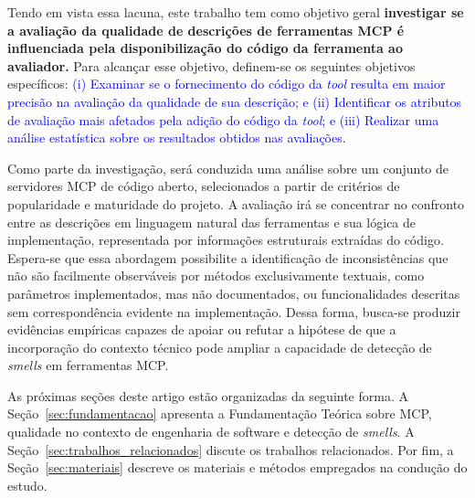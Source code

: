 Tendo em vista essa lacuna, este trabalho tem como objetivo geral \textbf{investigar se a avaliação da qualidade de descrições de ferramentas MCP é influenciada pela disponibilização do código da ferramenta ao avaliador.} Para alcançar esse objetivo, definem-se os seguintes objetivos específicos: \textcolor{blue}{(i) Examinar se o fornecimento do código da \textit{tool} resulta em maior precisão na avaliação da qualidade de sua descrição; e (ii) Identificar os atributos de avaliação mais afetados pela adição do código da \textit{tool}; e (iii) Realizar uma análise estatística sobre os resultados obtidos nas avaliações.}

Como parte da investigação, será conduzida uma análise sobre um conjunto de servidores MCP de código aberto, selecionados a partir de critérios de popularidade e maturidade do projeto. A avaliação irá se concentrar no confronto entre as descrições em linguagem natural das ferramentas e sua lógica de implementação, representada por informações estruturais extraídas do código. Espera-se que essa abordagem possibilite a identificação de inconsistências que não são facilmente observáveis por métodos exclusivamente textuais, como parâmetros implementados, mas não documentados, ou funcionalidades descritas sem correspondência evidente na implementação. Dessa forma, busca-se produzir evidências empíricas capazes de apoiar ou refutar a hipótese de que a incorporação do contexto técnico pode ampliar a capacidade de detecção de \textit{smells} em ferramentas MCP.

As próximas seções deste artigo estão organizadas da seguinte forma. A Seção~\ref{sec:fundamentacao} apresenta a Fundamentação Teórica sobre MCP, qualidade no contexto de engenharia de software e detecção de \textit{smells}. A Seção~\ref{sec:trabalhos_relacionados} discute os trabalhos relacionados. Por fim, a Seção~\ref{sec:materiais} descreve os materiais e métodos empregados na condução do estudo.
